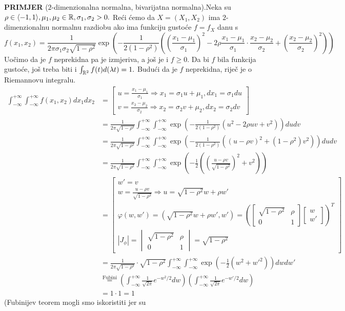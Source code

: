\documentclass{article}
\begin{document}
\textbf{PRIMJER} (\(2\)-dimenzionalna normalna, bivarijatna normalna).\newline Neka su \(\rho\in\langle -1,1\rangle,\mu_1,\mu_2\in\Bbb R,\sigma_1,\sigma_2>0.\) Reći ćemo da \(X=(X_1,X_2)\) ima \(2\)-dimenzionalnu normalnu razdiobu ako ima funkciju gustoće \(f=f_X\) danu s \[f(x_1,x_2)=\frac1{2\pi\sigma_1\sigma_2\sqrt{1-\rho^2}}\exp\left(-\frac1{2(1-\rho^2)}\left(\left(\frac{x_1-\mu_1}{\sigma_1}\right)^2-2\rho\frac{x_1-\mu_1}{\sigma_1}\cdot\frac{x_2-\mu_2}{\sigma_2}+\left(\frac{x_2-\mu_2}{\sigma_2}\right)^2\right)\right)\] Uočimo da je \(f\) neprekidna pa je izmjeriva, a još je i \(f\ge 0.\) Da bi \(f\) bila funkcija gustoće, još treba biti i \(\int_{\Bbb R^2}f(t)d(\lambda t)=1.\) Budući da je \(f\) neprekidna, riječ je o Riemannovu integralu. \[\begin{aligned}\int_{-\infty}^{+\infty}\int_{-\infty}^{+\infty}f(x_1,x_2)dx_1dx_2&=\begin{bmatrix}u=\frac{x_1-\mu_1}{\sigma_1}\Rightarrow x_1=\sigma_1u+\mu_1,dx_1=\sigma_1du\\v=\frac{x_2-\mu_2}{\sigma_2}\Rightarrow x_2=\sigma_2v+\mu_2,dx_2=\sigma_2dv\end{bmatrix}\\&=\frac1{2\pi\sqrt{1-\rho^2}}\int_{-\infty}^{+\infty}\int_{-\infty}^{+\infty}\exp\left(-\frac1{2(1-\rho^2)}\left(u^2-2\rho uv+v^2\right)\right)dudv\\&=\frac1{2\pi\sqrt{1-\rho^2}}\int_{-\infty}^{+\infty}\int_{-\infty}^{+\infty}\exp\left(-\frac1{2(1-\rho^2)}\left((u-\rho v)^2+(1-\rho^2)v^2\right)\right)dudv\\&=\frac1{2\pi\sqrt{1-\rho^2}}\int_{-\infty}^{+\infty}\int_{-\infty}^{+\infty}\exp\left(-\frac12\left(\left(\frac{u-\rho v}{\sqrt{1-\rho^2}}\right)^2+v^2\right)\right)\\&=\begin{bmatrix}w'=v\\w=\frac{u-\rho v}{\sqrt{1-\rho^2}}\Rightarrow u=\sqrt{1-\rho^2}w+\rho w'\\\varphi(w,w')=\left(\sqrt{1-\rho^2}w+\rho w',w'\right)=\left(\begin{bmatrix}\sqrt{1-\rho^2}&\rho\\0&1\end{bmatrix}\begin{bmatrix}w\\w'\end{bmatrix}\right)^T\\|J_\phi|=\begin{vmatrix}\sqrt{1-\rho^2}&\rho\\0&1\end{vmatrix}=\sqrt{1-\rho^2}\end{bmatrix}\\&=\frac1{2\pi\sqrt{1-\rho^2}}\cdot\sqrt{1-\rho^2}\int_{-\infty}^{+\infty}\int_{-\infty}^{+\infty}\exp\left(-\frac12(w^2+w'^2)\right)dwdw'\\&\overset{\text{Fubini}}{=}\left(\int_{-\infty}^{+\infty}\frac1{\sqrt{2\pi}}e^{-w^2/2}dw\right)\left(\int_{-\infty}^{+\infty}\frac1{\sqrt{2\pi}}e^{-w'/2}dw\right)\\&=1\cdot 1=1\end{aligned}\] (Fubinijev teorem mogli smo iskoristiti jer su 
\end{document}
